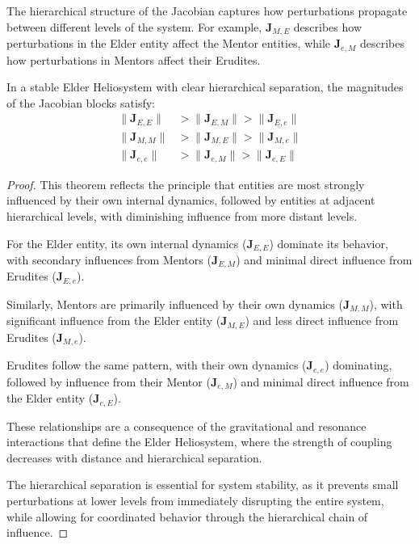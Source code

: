 The hierarchical structure of the Jacobian captures how perturbations propagate between different levels of the system. For example, $\mathbf{J}_{M,E}$ describes how perturbations in the Elder entity affect the Mentor entities, while $\mathbf{J}_{e,M}$ describes how perturbations in Mentors affect their Erudites.

\begin{theorem}
In a stable Elder Heliosystem with clear hierarchical separation, the magnitudes of the Jacobian blocks satisfy:
\begin{align}
\|\mathbf{J}_{E,E}\| &> \|\mathbf{J}_{E,M}\| > \|\mathbf{J}_{E,e}\| \\
\|\mathbf{J}_{M,M}\| &> \|\mathbf{J}_{M,E}\| > \|\mathbf{J}_{M,e}\| \\
\|\mathbf{J}_{e,e}\| &> \|\mathbf{J}_{e,M}\| > \|\mathbf{J}_{e,E}\|
\end{align}
\end{theorem}

\begin{proof}
This theorem reflects the principle that entities are most strongly influenced by their own internal dynamics, followed by entities at adjacent hierarchical levels, with diminishing influence from more distant levels.

For the Elder entity, its own internal dynamics ($\mathbf{J}_{E,E}$) dominate its behavior, with secondary influences from Mentors ($\mathbf{J}_{E,M}$) and minimal direct influence from Erudites ($\mathbf{J}_{E,e}$).

Similarly, Mentors are primarily influenced by their own dynamics ($\mathbf{J}_{M,M}$), with significant influence from the Elder entity ($\mathbf{J}_{M,E}$) and less direct influence from Erudites ($\mathbf{J}_{M,e}$).

Erudites follow the same pattern, with their own dynamics ($\mathbf{J}_{e,e}$) dominating, followed by influence from their Mentor ($\mathbf{J}_{e,M}$) and minimal direct influence from the Elder entity ($\mathbf{J}_{e,E}$).

These relationships are a consequence of the gravitational and resonance interactions that define the Elder Heliosystem, where the strength of coupling decreases with distance and hierarchical separation.

The hierarchical separation is essential for system stability, as it prevents small perturbations at lower levels from immediately disrupting the entire system, while allowing for coordinated behavior through the hierarchical chain of influence.
\end{proof}


